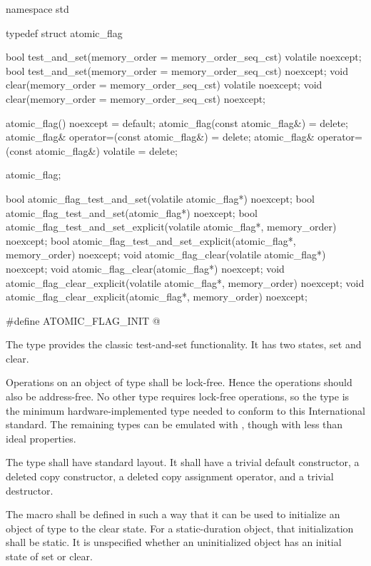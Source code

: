\begin{codeblock}
namespace std {
  typedef struct atomic_flag {
    bool test_and_set(memory_order = memory_order_seq_cst) volatile noexcept;
    bool test_and_set(memory_order = memory_order_seq_cst) noexcept;
    void clear(memory_order = memory_order_seq_cst) volatile noexcept;
    void clear(memory_order = memory_order_seq_cst) noexcept;

    atomic_flag() noexcept = default;
    atomic_flag(const atomic_flag&) = delete;
    atomic_flag& operator=(const atomic_flag&) = delete;
    atomic_flag& operator=(const atomic_flag&) volatile = delete;
  } atomic_flag;

  bool atomic_flag_test_and_set(volatile atomic_flag*) noexcept;
  bool atomic_flag_test_and_set(atomic_flag*) noexcept;
  bool atomic_flag_test_and_set_explicit(volatile atomic_flag*, memory_order) noexcept;
  bool atomic_flag_test_and_set_explicit(atomic_flag*, memory_order) noexcept;
  void atomic_flag_clear(volatile atomic_flag*) noexcept;
  void atomic_flag_clear(atomic_flag*) noexcept;
  void atomic_flag_clear_explicit(volatile atomic_flag*, memory_order) noexcept;
  void atomic_flag_clear_explicit(atomic_flag*, memory_order) noexcept;

  #define ATOMIC_FLAG_INIT @\seebelow@
}
\end{codeblock}

\pnum
The  type provides the classic test-and-set functionality. It has two states, set and clear.

\pnum
Operations on an object of type  shall be lock-free. \enternote Hence
the operations should also be address-free. No other type requires lock-free operations,
so the  type is the minimum hardware-implemented type needed to
conform to this International standard. The remaining types can be emulated with
, though with less than ideal properties. \exitnote

\pnum
The  type shall have standard layout. It shall have a trivial default constructor, a deleted copy constructor, a deleted copy assignment operator, and a trivial destructor.

\pnum
The macro  shall be defined in such a way that it can be used to initialize an object of type  to the
clear state. For a static-duration object, that initialization shall be static. It is unspecified whether an
uninitialized  object has an initial state of set or clear.\enterexample


